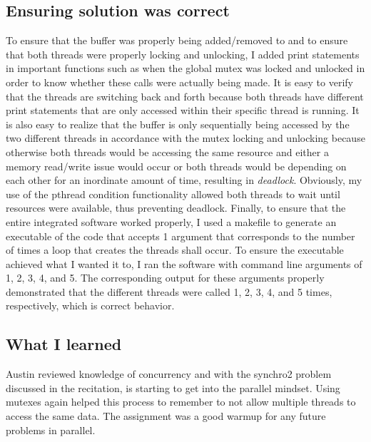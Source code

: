 \documentclass[letterpaper,10pt,titlepage]{article}
\begin{document}
\subsection{Ensuring solution was correct}
To ensure that the buffer was properly being added/removed to and to ensure that both threads were properly locking and unlocking, I added print statements in important functions such as when the global mutex was locked and unlocked in order to know whether these calls were actually being made. It is easy to verify that the threads are switching back and forth because both threads have different print statements that are only accessed within their specific thread is running. It is also easy to realize that the buffer is only sequentially being accessed by the two different threads in accordance with the mutex locking and unlocking because otherwise both threads would be accessing the same resource and either a memory read/write issue would occur or both threads would be depending on each other for an inordinate amount of time, resulting in \emph{deadlock}. Obviously, my use of the pthread condition functionality allowed both threads to wait until resources were available, thus preventing deadlock. Finally, to ensure that the entire integrated software worked properly, I used a makefile to generate an executable of the code that accepts 1 argument that corresponds to the number of times a loop that creates the threads shall occur. To ensure the executable achieved what I wanted it to, I ran the software with command line arguments of 1, 2, 3, 4, and 5. The corresponding output for these arguments properly demonstrated that the different threads were called 1, 2, 3, 4, and 5 times, respectively, which is correct behavior.

\subsection{What I learned}
Austin reviewed knowledge of concurrency and with the synchro2 problem discussed in the recitation, is starting to get into the parallel mindset. Using mutexes again helped this process to remember to not allow multiple threads to access the same data.  The assignment was a good warmup for any future problems in parallel.
\end{document}
